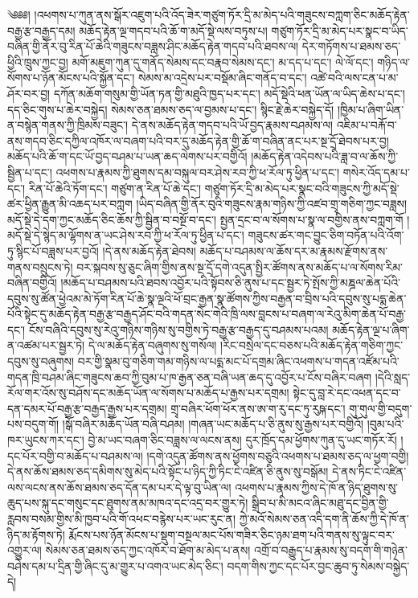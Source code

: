 \setcounter{footnote}{0} 
༄༅༅། །འཕགས་པ་ཀུན་ནས་སྒོར་འཇུག་པའི་འོད་ཟེར་གཙུག་ཏོར་དྲི་མ་མེད་པའི་གཟུངས་བཀླག་ཅིང་མཆོད་རྟེན་བརྒྱ་རྩ་བརྒྱད་དམ། མཆོད་རྟེན་ལྔ་གདབ་པའི་ཆོ་ག་མདོ་སྡེ་ལས་བཏུས་པ། གཙུག་ཏོར་དྲི་མ་མེད་པར་སྣང་བ་ཡིད་བཞིན་གྱི་ནོར་བུ་རིན་པོ་ཆེའི་གཟུངས་བཟླས་ཤིང་མཆོད་རྟེན་གདབ་པའི་ཐབས་ལ། དེར་གཏོགས་པ་ཐམས་ཅད་ཕྱིའི་ཁྲུས་ཀྱང་བྱ། མགོ་མཇུག་ཀུན་དུ་གནོད་སེམས་དང་བརྣབ་སེམས་དང་། མ་དད་པ་དང་། ལེ་ལོ་དང་། གཉིད་ལ་སོགས་པ་ཉོན་མོངས་པའི་སྐྱོན་དང་། སེམས་མ་འདྲེས་པར་བསྡོམ་ཞིང་གནོད་བ་དང་། འཚེ་བའི་ལས་ངན་པ་མ་ཤོར་བར་བྱ། དཀོན་མཆོག་གསུམ་གྱི་ཡོན་ཏན་གྱི་མཐུའི་ཁྱད་པར་དང་། མདོ་སྡེའི་ཕན་ཡོན་ལ་ཡིད་ཆེས་པ་དང་། དད་ཅིང་གུས་པ་ཆེར་བསྐྱེད། སེམས་ཅན་ཐམས་ཅད་ལ་བྱམས་པ་དང་། སྙིང་རྗེ་ཆེར་བསྐྱེད་དོ། །ཁྱིམ་པ་ཞིག་ཡིན་ན་བསྙེན་གནས་ཀྱི་ཁྲིམས་བཟུང་། དེ་ནས་མཆོད་རྟེན་གདབ་པའི་ཡོ་བྱད་རྣམས་བཤམས་ལ། འཇིམ་པ་བརྐོ་བ་ནས་གདབ་ཅིང་དཀྱིལ་འཁོར་ལ་བཞག་པའི་བར་དུ་མཆོད་རྟེན་གྱི་ཆོ་ག་བཞིན་ནང་པར་སྔ་དྲོ་ཐེབས་པར་བྱ། མཆོད་པའི་ཆོ་ག་དང་ཡོ་བྱད་བཤམ་པ་ཡན་ཆད་ལེགས་པར་བགྱིའོ། །མཆོད་རྟེན་འདེབས་པའི་ཟླ་བ་ལ་ཆོས་ཀྱི་སྦྱིན་པ་དང་། འཕགས་པ་རྣམས་ཀྱི་ཐུགས་དམ་བསྐུལ་བར་ཤེས་རབ་ཀྱི་ཕ་རོལ་ཏུ་ཕྱིན་པ་དང་། གསེར་འོད་དམ་པ་དང་། རིན་པོ་ཆེའི་ཏོག་དང་། གཙུག་ན་རིན་པོ་ཆེ་དང་། གཙུག་ཏོར་དྲི་མ་མེད་པར་སྣང་བའི་གཟུངས་ཀྱི་མདོ་སྡེ་ཚར་ཕྱིན་རྒྱུན་མི་འཆད་པར་བཀླག །ཡིད་བཞིན་གྱི་ནོར་བུའི་གཟུངས་རྣམ་གཉིས་ཀྱི་འཛབ་གྲྭ་གཅིག་ཀྱང་བཟླས། མདོ་སྡེ་དེ་དག་ཀྱང་མཆོད་ཅིང་ཆོས་ཀྱི་སྦྱིན་བ་བསྔོ་བ་དང་། སྤྱན་དྲང་བ་ལ་སོགས་པ་སྣ་ལ་བགྱིས་ནས་བཀླག་གོ །མདོ་སྡེ་དེ་སྙེད་མ་ལྷོགས་ན་ཡང་ཤེས་རབ་ཀྱི་ཕ་རོལ་ཏུ་ཕྱིན་པ་དང་། གཟུངས་ཚར་གང་བྱུང་ཅིག་བཏོན་པའི་འོག་ཏུ་སྙིང་པོ་བཟླས་པར་བྱའོ། །དེ་ནས་མཆོད་རྟེན་ཐེབས། མཆོད་པ་བཤམས་ལ་ཆོས་དར་མ་རྣམས་རྫོགས་ནས་གནས་བསྲུངས་ཏེ། བར་སྐབས་སུ་ཅུང་ཞིག་གྱིས་ནས་སྔ་དྲོ་དགེ་འདུན་སྤྱིར་ཚོགས་ནས་མཆོད་པ་ལ་སོགས་རིམ་བཞིན་བགྱིའོ། །མཆོད་པ་བཤམས་པའི་ཐབས་འབྱོར་པའི་སྟོབས་ཅི་ནུས་པ་དང་སྦྱར་ཏེ་སྤོས་ཀྱི་མཎྜལ་ཆེན་པོའི་དབུས་སུ་ཚོན་ཕྱེའམ་མེ་ཏོག་རིན་པོ་ཆེ་སྣ་ལྔའི་ཕོ་བྲང་རྒྱན་སྣ་ཚོགས་ཀྱིས་བརྒྱན་བ་བྲིས་པའི་དབུས་སུ་པདྨ་ཆེན་པོའི་སྟེང་དུ་མཆོད་རྟེན་བརྒྱ་རྩ་བརྒྱད་ཤོང་བའི་གདན་སེང་གེའི་ཁྲི་ལས་བླངས་པ་བཞག་ལ་རེའུ་མིག་ཆེན་པོ་བརྒྱ་དང་། ངོས་བཞིའི་དབུས་སུ་རེའུ་གཉིས་གཉིས་སུ་བགྱིས་ཏེ་བརྒྱ་རྩ་བརྒྱད་དུ་བཤམས་པའམ། མཆོད་རྟེན་ལྔ་པ་ཞིག་ན་འཚམ་པར་སྦྱར་ཏེ། དེ་ལ་མཆོད་རྟེན་བཞུགས་སུ་གསོལ། །རིང་བསྲེལ་དང་བཅས་པའི་མཆོད་རྟེན་གཅིག་ཀྱང་དབུས་སུ་བཞུགས། བར་གྱི་སྣམ་བུ་གཅིག་གམ་གཉིས་ལ་པདྨ་མང་པོ་དགྲམ་ཞིང་འཕགས་པ་གདན་འཛོམ་པའི་གདན་ཁྲི་བཤམ་ཞིང་གཟུངས་ཆབ་ཀྱི་བུམ་པ་ཁ་རྒྱན་ཅན་བཞི་ཡན་ཆད་དུ་འབྱོར་པ་ངོས་བཞིར་བཞག །དེའི་སླད་རོལ་གར་འོས་སུ་བཤོས་དང་མཆོད་ཡོན་ལ་སོགས་པ་མཆོད་པ་རྒྱས་པར་དགྲམ། སྟེང་དུ་བླ་རེ་དང་འཕན་དང་བ་དན་དམར་པོ་བརྒྱ་རྩ་བརྒྱད་རྒྱས་པར་དགྲམ། གྲྭ་བཞིར་ཕོག་ཕོར་ནས་ཨ་ག་རུ་དང་ཏུ་རུཥྐ་དང་། གུ་གུལ་གྱི་བདུག་པས་བདུག་གོ། །སྒོ་བཞིར་མཆོད་ཡོན་བཞི་བཤམ། །གཞན་ཡང་མཆོད་པ་ཅི་ནུས་སུ་རྒྱས་པར་བགྱིའོ། །བུམ་པའི་ཁར་ཡུངས་ཀར་དང་། བྱེ་མ་ཡང་བཞག་ཅིང་བཟླས་ལ་ལངས་ནས། དུར་ཁྲོད་དམ་ཕྱོགས་ཀུན་དུ་ཡང་གཏོར་རོ། །དང་པོར་བགྱི་བ་མཆོད་པ་བཤམས་ལ། །དགེ་འདུན་ཚོགས་ནས་ཕྱོགས་བཅུའི་འཕགས་པ་ཐམས་ཅད་ལ་ཕྱག་བགྱི། དེ་ནས་ཆོས་ཐམས་ཅད་དམིགས་སུ་མེད་པའི་སྟོང་པ་ཉིད་ཀྱི་ཏིང་ངེ་འཛིན་ཅི་ནུས་སུ་བསྒོམ། དེ་ནས་ཏིང་ངེ་འཛིན་ལས་ལངས་ནས་ཆོས་ཐམས་ཅད་དོན་དམ་པར་དེ་ལྟ་བུ་ཡིན་ལ། འཕགས་པ་རྣམས་ཀྱིས་དེ་ཁོ་ན་ཉིད་ཐུགས་སུ་ཆུད་པས་སྐུ་དང་གསུང་དང་ཐུགས་ནམ་མཁའ་དང་འདྲ་བར་གྱུར་ཏེ། སྒྲིབ་པ་མི་མངའ་ཞིང་མཐུ་དང་བྱིན་གྱི་རླབས་བསམ་གྱིས་མི་ཁྱབ་པའི་གོ་འཕང་བརྙེས་པར་ཡང་རུང་ན། ཀྱེ་མའོ་སེམས་ཅན་འདི་དག་ནི་ཆོས་ཀྱི་དེ་ཁོ་ན་ཉིད་མ་རྟོགས་ཏེ། རྨོངས་པས་ཉོན་མོངས་པ་སྡུག་བསྔལ་མང་པོས་གཟིར་ཅིང་ཉམ་ཐག་པའི་གནས་སུ་ལྟུང་བར་འགྱུར་ལ། སེམས་ཅན་ཐམས་ཅད་ཀྱང་འཁོར་བ་ཐོག་མ་མེད་པ་ནས། འགྲོ་བ་བརྒྱུད་པ་རྣམས་སུ་བདག་གི་གཉེན་བཤེས་དམ་པ་དྲིན་གྱི་ཞིང་དུ་མ་གྱུར་པ་འགའ་ཡང་མེད་ཅིང་། བདག་གིས་ཀྱང་དང་པོར་བྱང་ཆུབ་ཏུ་སེམས་བསྐྱེད་དེ། 